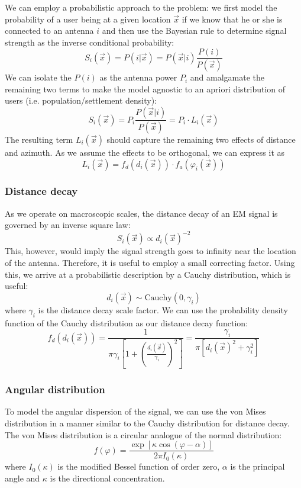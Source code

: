\documentclass[a4paper]{article}
\begin{document}
We can employ a probabilistic approach to the problem: we first model the
probability of a user being at a given location $\vec{x}$ if we know that he
or she is connected to an antenna $i$ and then use the Bayesian rule to
determine signal strength as the inverse conditional probability:
\begin{equation}
S_i(\vec{x}) = P(i|\vec{x}) = P(\vec{x}|i) \frac{P(i)}{P(\vec{x})}
\end{equation}
We can isolate the $P(i)$ as the antenna power $P_i$ and amalgamate the
remaining two terms to make the model agnostic to an apriori distribution of
users (i.e. population/settlement density):
\begin{equation}
S_i(\vec{x}) = P_i \frac{P(\vec{x}|i)}{P(\vec{x})} = P_i \cdot L_i(\vec{x})
\end{equation}
The resulting term $L_i(\vec{x})$ should capture the remaining two effects of
distance and azimuth. As we assume the effects to be orthogonal, we can
express it as
\begin{equation}
L_i(\vec{x}) = f_d(d_i(\vec{x})) \cdot f_a(\varphi_i(\vec{x}))
\end{equation}

\subsubsection{Distance decay}
As we operate on macroscopic scales, the distance decay of an EM signal is
governed by an inverse square law:
\begin{equation}
S_i(\vec{x}) \propto d_i(\vec{x})^{-2}
\end{equation}
This, however, would imply the signal strength goes to infinity near the
location of the antenna. Therefore, it is useful to employ a small correcting
factor. Using this, we arrive at a probabilistic description by a Cauchy
distribution, which is useful:
\begin{equation}
d_i(\vec{x}) \sim \mathrm{Cauchy}(0,\gamma_i)
\end{equation}
where $\gamma_i$ is the distance decay scale factor. We can use the probability
density function of the Cauchy distribution as our distance decay function:
\begin{equation}
f_d(d_i(\vec{x})) = \frac{1}{
    \pi \gamma_i \left[1 + \left( \frac{d_i(\vec{x})}{\gamma_i} \right)^2 \right]
} = \frac{\gamma_i}{\pi [d_i(\vec{x})^2 + \gamma_i^2]}
\end{equation}

\subsubsection{Angular distribution}
To model the angular dispersion of the signal, we can use the von Mises
distribution in a manner similar to the Cauchy distribution for distance decay.
The von Mises distribution is a circular analogue of the normal distribution:
\begin{equation}
f(\varphi) = \frac{\exp{[\kappa \cos{(\varphi - \alpha)}]}}{2\pi I_0(\kappa)}
\end{equation}
where $I_0(\kappa)$ is the modified Bessel function of order zero, $\alpha$ is
the principal angle and $\kappa$ is the directional concentration.
\end{document}
